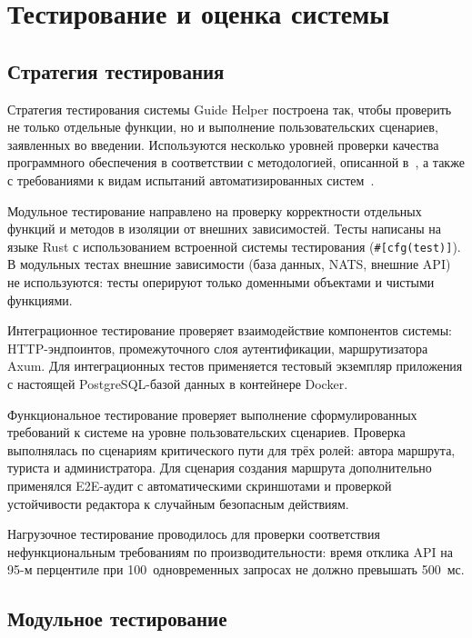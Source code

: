 \chapter{Тестирование и оценка системы}

\section{Стратегия тестирования}

Стратегия тестирования системы Guide Helper построена так, чтобы проверить не
только отдельные функции, но и выполнение пользовательских сценариев, заявленных
во введении. Используются несколько уровней проверки качества программного
обеспечения в соответствии с методологией, описанной в~\cite{kulikov2020testing,sommerville2016,pressman2014,lipaev2010,kaner2001,savin2007},
а также с требованиями к видам испытаний автоматизированных систем~\cite{gost34603}.

Модульное тестирование направлено на проверку корректности отдельных функций и методов в изоляции от внешних зависимостей. Тесты написаны на языке Rust с использованием встроенной системы тестирования (\texttt{\#[cfg(test)]}). В модульных тестах внешние зависимости (база данных, NATS, внешние API) не используются: тесты оперируют только доменными объектами и чистыми функциями.

Интеграционное тестирование проверяет взаимодействие компонентов системы: HTTP-эндпоинтов, промежуточного слоя аутентификации, маршрутизатора Axum. Для интеграционных тестов применяется тестовый экземпляр приложения с настоящей PostgreSQL-базой данных в контейнере Docker.

Функциональное тестирование проверяет выполнение сформулированных требований к
системе на уровне пользовательских сценариев. Проверка выполнялась по сценариям
критического пути для трёх ролей: автора маршрута, туриста и администратора. Для
сценария создания маршрута дополнительно применялся E2E-аудит с автоматическими
скриншотами и проверкой устойчивости редактора к случайным безопасным действиям.

Нагрузочное тестирование проводилось для проверки соответствия нефункциональным
требованиям по производительности: время отклика API на 95-м перцентиле при
100~одновременных запросах не должно превышать 500~мс.

\section{Модульное тестирование}

